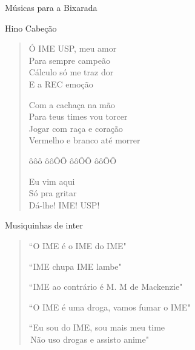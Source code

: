 \begin{secao}{Músicas para a Bixarada}

\begin{subsecao}{Hino Cabeção}
\begin{verse}

Ó IME USP, meu amor\\
Para sempre campeão\\
Cálculo só me traz dor\\
E a REC emoção

Com a cachaça na mão\\
Para teus times vou torcer\\
Jogar com raça e coração\\
Vermelho e branco até morrer

ôôô ôôÔÔ ôôÔÔ ôôÔÔ

Eu vim aqui\\
Só pra gritar\\
Dá-lhe! IME! USP!
\end{verse}
\end{subsecao}

\begin{subsecao}{Musiquinhas de inter}
\begin{verse}

``O IME é o IME do IME"

``IME chupa IME lambe"

``IME ao contrário é M. M de Mackenzie"

``O IME é uma droga, vamos fumar o IME"

``Eu sou do IME, sou mais meu time\\ 
\,Não uso drogas e assisto anime"

\end{verse}
\end{subsecao}
\pagebreak




\end{secao}
